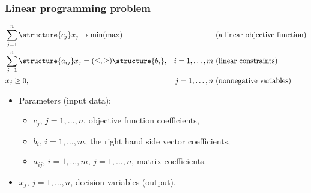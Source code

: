 \documentclass[landscape]{beamer}
\begin{document}
\begin{frame}
  \frametitle{Linear programming problem}  
 

\begin{align*}
     & \sum_{j=1}^{n}\structure{c_j} x_j \rightarrow \min (\max)&& \text{ (a linear objective function)}\\
      &\sum_{j=1}^{n} \structure{a_{ij}}x_j = (\leq, \geq) \structure{b_i},  & i=1,\ldots, m&\text{  (linear constraints) }\\
      &x_j\geq 0,  &j=1,\ldots, n& \text{ (nonnegative variables)}
\end{align*}
\begin{itemize}
\item Parameters (input data):
     \begin{itemize}
        \item $c_j$, $j=1,\ldots, n$, objective function coefficients,
        \item  $b_i$, $i=1,\ldots, m$, the right hand side vector coefficients,
        \item $a_{ij}$, $i=1,\ldots, m$,  $j=1,\ldots, n$, matrix coefficients. 
     \end{itemize}
\item $x_j$,  $j=1,\ldots, n$, decision variables (output).    
\end{itemize}


\end{frame}  
\end{document}
